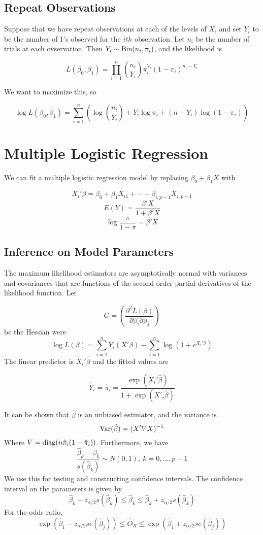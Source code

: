 \subsection{Repeat Observations}

Suppose that we have repeat observations at each of the levels of $X$, and set $Y_i$ to be the number of 1's observed for the $ith$ observation. Let $n_i$ be the number of trials at each ovservation. Then $Y_i \sim \operatorname{Bin}(n_i, \pi_i)$, and the likelihood
is 

\[L(\beta_0, \beta_1) = \prod_{i=1}^n {n_i \choose Y_i} \pi_i^{Y_i}(1-\pi_i)^{n_i - Y_i}\]

We want to maximize this, so 

\[\log L(\beta_0, \beta_1) = \sum_{i=1}^n \left(\log {n_i \choose Y_i} + Y_i \log \pi_i + (n-Y_i)\log(1-\pi_i)\right)\]

\section{Multiple Logistic Regression}

We can fit a multiple logistic regression model by replacing $\beta_0 + \beta_1X$ with 

\[X_i' \beta = \beta_0 + \beta_{1}X_{i1} + \cdots + \beta_{i,p-1}X_{i,p-1} \]
\[E(Y) = \frac{\beta'X}{1 + \beta'X}\]
\[\log\frac{\pi}{1-\pi} = \beta'X\]

\subsection{Inference on Model Parameters}

The maximum likelihood estimators are asymptotically normal with variances and covariances that are functions of the second order partial derivatives of the likelihood function. Let 

\[G = \left(\frac{\partial^2 L(\beta)}{\partial\beta_i \partial\beta_j}\right)\]
be the Hessian were 
\[\log L(\beta) = \sum_{i=1}^n Y_i (X'\beta) - \sum_{i=1}^n \log(1 + e^{X_i' \beta})\]
The linear predictor is $X_i'\hat{\beta}$ and the fitted values are 

\[\hat{Y}_i = \hat{\pi}_i = \frac{\exp(X_i'\hat{\beta})}{1 + \exp(X'_i\hat{\beta})}\]

It can be shown that $\hat{\beta}$ is an unbiased estimator, and the variance is 
\[\operatorname{Var}(\hat{\beta}) = (X'VX)^{-1}\]
Where $V = \operatorname{diag}(n\hat{\pi}_i(1-\hat{\pi}_i))$. Furthermore, we have 
\[\frac{\hat{\beta}_k - \beta_k}{s(\hat{\beta}_k)} \sim N(0,1), \ k = 0, \ldots, p-1\]
\noindent
We use this for testing and constructing confidence intervals. The confidence interval on the parameters is given by 
\[ \hat{\beta}_k - z_{\alpha/2}s(\hat{\beta}_k) \leq \hat{\beta}_k \leq \hat{\beta}_k + z_{\alpha/2}s(\hat{\beta}_k)\]
For the odds ratio, 
\[\exp(\hat{\beta}_1 - z_{\alpha/2}se(\hat{\beta}_j)) \leq \hat{O}_R \leq \exp(\hat{\beta}_1 + z_{\alpha/2}se(\hat{\beta}_j))\]




